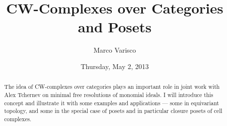 \documentclass{UAmathtalk}
\author{Marco Varisco}
\title{CW-Complexes over Categories and Posets}
\date{Thursday, May 2, 2013}
\begin{document}
\maketitle

\begin{abstract}
The idea of CW-complexes over categories plays an important role in joint work with Alex Tchernev on minimal free resolutions of monomial ideals.
I will introduce this concept and illustrate it with some examples and applications --- some in equivariant topology, and some in the special case of posets and in particular closure posets of cell complexes.
\end{abstract}
\end{document}
